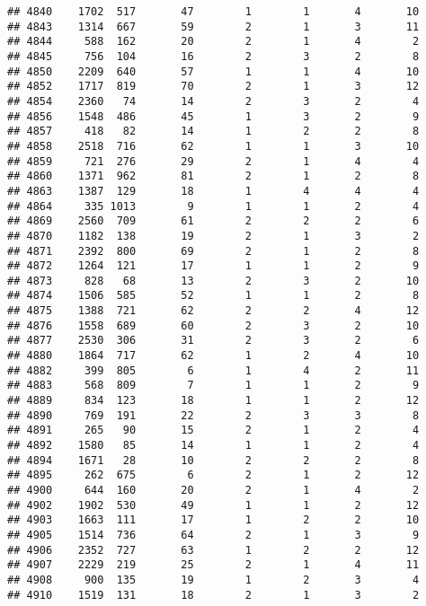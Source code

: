 \documentclass[]{article}
\begin{document}
\begin{verbatim}
## 4840    1702  517       47        1        1       4       10
## 4843    1314  667       59        2        1       3       11
## 4844     588  162       20        2        1       4        2
## 4845     756  104       16        2        3       2        8
## 4850    2209  640       57        1        1       4       10
## 4852    1717  819       70        2        1       3       12
## 4854    2360   74       14        2        3       2        4
## 4856    1548  486       45        1        3       2        9
## 4857     418   82       14        1        2       2        8
## 4858    2518  716       62        1        1       3       10
## 4859     721  276       29        2        1       4        4
## 4860    1371  962       81        2        1       2        8
## 4863    1387  129       18        1        4       4        4
## 4864     335 1013        9        1        1       2        4
## 4869    2560  709       61        2        2       2        6
## 4870    1182  138       19        2        1       3        2
## 4871    2392  800       69        2        1       2        8
## 4872    1264  121       17        1        1       2        9
## 4873     828   68       13        2        3       2       10
## 4874    1506  585       52        1        1       2        8
## 4875    1388  721       62        2        2       4       12
## 4876    1558  689       60        2        3       2       10
## 4877    2530  306       31        2        3       2        6
## 4880    1864  717       62        1        2       4       10
## 4882     399  805        6        1        4       2       11
## 4883     568  809        7        1        1       2        9
## 4889     834  123       18        1        1       2       12
## 4890     769  191       22        2        3       3        8
## 4891     265   90       15        2        1       2        4
## 4892    1580   85       14        1        1       2        4
## 4894    1671   28       10        2        2       2        8
## 4895     262  675        6        2        1       2       12
## 4900     644  160       20        2        1       4        2
## 4902    1902  530       49        1        1       2       12
## 4903    1663  111       17        1        2       2       10
## 4905    1514  736       64        2        1       3        9
## 4906    2352  727       63        1        2       2       12
## 4907    2229  219       25        2        1       4       11
## 4908     900  135       19        1        2       3        4
## 4910    1519  131       18        2        1       3        2

\end{verbatim}
\end{document}
